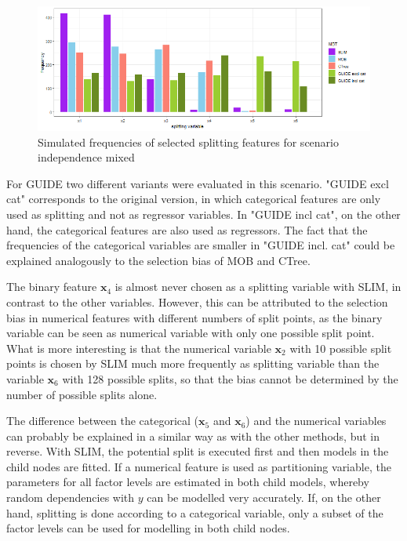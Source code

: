 \begin{figure}[!htb]
    \centering
    \includegraphics[width=14cm]{Figures/simulations/chapter_4_selection_bias/selection_bias_general/independence_mixed.png}
    \caption{Simulated frequencies of selected splitting features for scenario independence mixed}
    \label{fig:selection_bias_independence_mixed}
\end{figure}

For GUIDE two different variants were evaluated in this scenario. "GUIDE excl cat" corresponds to the original version, in which categorical features are only used as splitting and not as regressor variables. In "GUIDE incl cat", on the other hand, the categorical features are also used as regressors. The fact that the frequencies of the categorical variables are smaller in "GUIDE incl. cat" could be explained analogously to the selection bias of MOB and CTree.

The binary feature $\textbf{x}_4$ is almost never chosen as a splitting variable with SLIM, in contrast to the other variables. However, this can be attributed to the selection bias in numerical features with different numbers of split points, as the binary variable can be seen as numerical variable with only one possible split point. What is more interesting is that the numerical variable $\textbf{x}_2$ with 10 possible split points is chosen by SLIM much more frequently as splitting variable than the variable $\textbf{x}_6$ with 128 possible splits, so that the bias cannot be determined by the number of possible splits alone.

The difference between the categorical ($\textbf{x}_5$ and $\textbf{x}_6$) and the numerical variables can probably be explained in a similar way as with the other methods, but in reverse. With SLIM, the potential split is executed first and then models in the child nodes are fitted.  If a numerical feature is used as partitioning variable, the parameters for all factor levels are estimated in both child models, whereby random dependencies with $y$ can be modelled very accurately. If, on the other hand, splitting is done according to a categorical variable, only a subset of the factor levels can be used for modelling in both child nodes.






